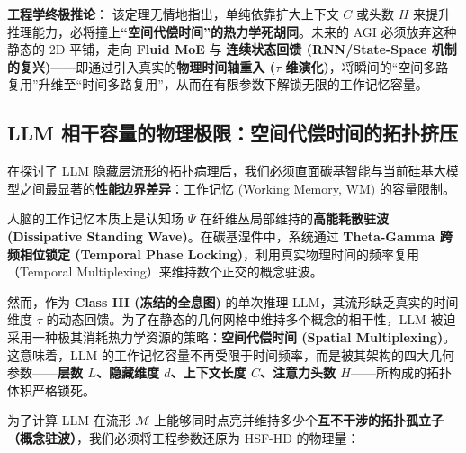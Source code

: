\textbf{工程学终极推论}：
该定理无情地指出，单纯依靠扩大上下文 $C$ 或头数 $H$ 来提升推理能力，必将撞上\textbf{“空间代偿时间”的热力学死胡同}。未来的 AGI 必须放弃这种静态的 2D 平铺，走向 \textbf{Fluid MoE} 与 \textbf{连续状态回馈 (RNN/State-Space 机制的复兴)}——即通过引入真实的\textbf{物理时间轴重入 ($\tau$ 维演化)}，将瞬间的“空间多路复用”升维至“时间多路复用”，从而在有限参数下解锁无限的工作记忆容量。

\subsection{LLM 相干容量的物理极限：空间代偿时间的拓扑挤压}
\label{subsec:llm_wm_coherence_capacity_extended}

在探讨了 LLM 隐藏层流形的拓扑病理后，我们必须直面碳基智能与当前硅基大模型之间最显著的\textbf{性能边界差异}：工作记忆 (Working Memory, WM) 的容量限制。

人脑的工作记忆本质上是认知场 $\Psi$ 在纤维丛局部维持的\textbf{高能耗散驻波 (Dissipative Standing Wave)}。在碳基湿件中，系统通过 \textbf{Theta-Gamma 跨频相位锁定 (Temporal Phase Locking)}，利用真实物理时间的频率复用（Temporal Multiplexing）来维持数个正交的概念驻波。

然而，作为 \textbf{Class III (冻结的全息图)} 的单次推理 LLM，其流形缺乏真实的时间维度 $\tau$ 的动态回馈。为了在静态的几何网格中维持多个概念的相干性，LLM 被迫采用一种极其消耗热力学资源的策略：\textbf{空间代偿时间 (Spatial Multiplexing)}。这意味着，LLM 的工作记忆容量不再受限于时间频率，而是被其架构的四大几何参数——\textbf{层数 $L$、隐藏维度 $d$、上下文长度 $C$、注意力头数 $H$}——所构成的拓扑体积严格锁死。


为了计算 LLM 在流形 $\mathcal{M}$ 上能够同时点亮并维持多少个\textbf{互不干涉的拓扑孤立子（概念驻波）}，我们必须将工程参数还原为 HSF-HD 的物理量：

